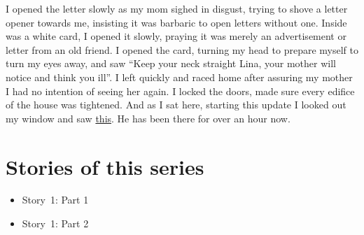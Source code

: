 \documentclass[a5paper]{scrartcl}
\begin{document}
I opened the letter slowly as my mom sighed in disgust, trying to shove a letter opener towards me, insisting it was barbaric to open letters without one. Inside was a white card, I opened it slowly, praying it was merely an advertisement or letter from an old friend. I opened the card, turning my head to prepare myself to turn my eyes away, and saw \enquote{Keep your neck straight Lina, your mother will notice and think you ill}.
I left quickly and raced home after assuring my mother I had no intention of seeing her again. I locked the doors, made sure every edifice of the house was tightened. And as I sat here, starting this update I looked out my window and saw \href{http://imgur.com/99g68Nr}{this}.
He has been there for over an hour now.\\


\clearpage
\section*{Stories of this series}

\begin{itemize}
    \item Story~1: Part 1
    \item Story~1: Part 2
\end{itemize}
\end{document}
